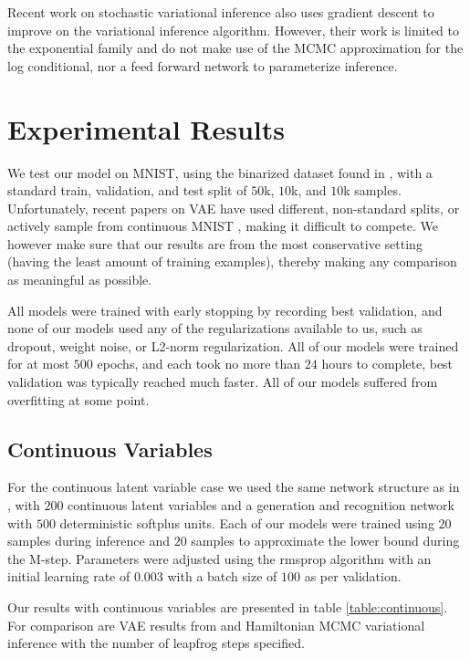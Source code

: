 \documentclass[preprint, twocolumn]{article}
\begin{document}
Recent work on stochastic variational inference \cite{hoffman2013stochastic} also uses gradient descent to improve on the variational inference algorithm. However, their work is limited to the exponential family and do not make use of the MCMC approximation for the log conditional, nor a feed forward network to parameterize inference.

\section{Experimental Results}
We test our model on MNIST, using the binarized dataset found in \cite{salakhutdinov2008quantitative}, with a standard train, validation, and test split of $50$k, $10$k, and $10$k samples. Unfortunately, recent papers on VAE \cite{mnih2014neural, salimans2014markov} have used different, non-standard splits, or actively sample from continuous MNIST \cite{burda2015importance}, making it difficult to compete. We however make sure that our results are from the most conservative setting (having the least amount of training examples), thereby making any comparison as meaningful as possible.

All models were trained with early stopping by recording best validation, and none of our models used any of the regularizations available to us, such as dropout, weight noise, or L2-norm regularization. All of our models were trained for at most $500$ epochs, and each took no more than $24$ hours to complete, best validation was typically reached much faster. All of our models suffered from overfitting at some point.

\subsection{Continuous Variables}
For the continuous latent variable case we used the same network structure as in \cite{kingma2013auto, salimans2014markov}, with $200$ continuous latent variables and a generation and recognition network with $500$ deterministic softplus units. Each of our models were trained using $20$ samples during inference and $20$ samples to approximate the lower bound during the M-step. Parameters were adjusted using the rmsprop algorithm \cite{Hinton-Coursera2012} with an initial learning rate of \num{0.003} with a batch size of $100$ as per validation.

Our results with continuous variables are presented in table \ref{table:continuous}. For comparison are VAE results from \cite{kingma2013auto} and Hamiltonian MCMC variational inference \cite{salimans2014markov} with the number of leapfrog steps specified.
\end{document}
